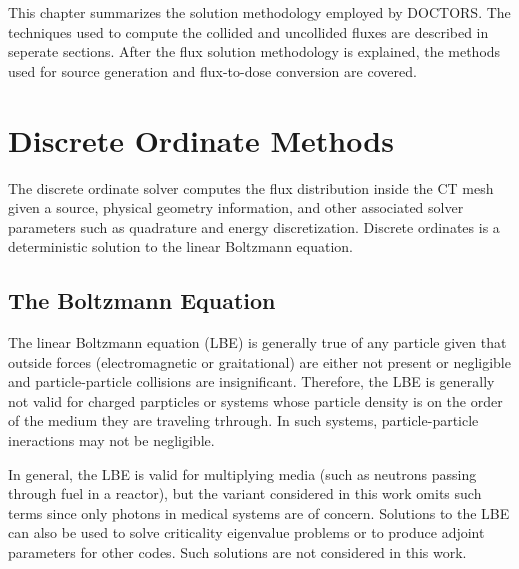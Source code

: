 
This chapter summarizes the solution methodology employed by DOCTORS. The techniques used to compute the collided and uncollided fluxes are described in seperate sections. After the flux solution methodology is explained, the methods used for source generation and flux-to-dose conversion are covered.

\section{Discrete Ordinate Methods}

The discrete ordinate solver computes the flux distribution inside the CT mesh given a source, physical geometry information, and other associated solver parameters such as quadrature and energy discretization. Discrete ordinates is a deterministic solution to the linear Boltzmann equation.

\subsection{The Boltzmann Equation}

The linear Boltzmann equation (LBE) is generally true of any particle given that outside forces (electromagnetic or graitational) are either not present or negligible and particle-particle collisions are insignificant. Therefore, the LBE is generally not valid for charged parpticles or systems whose particle density is on the order of the medium they are traveling trhrough. In such systems, particle-particle ineractions may not be negligible.  

In general, the LBE is valid for multiplying media (such as neutrons passing through fuel in a reactor), but the variant considered in this work omits such terms since only photons in medical systems are of concern. Solutions to the LBE can also be used to solve criticality eigenvalue problems or to produce adjoint parameters for other codes. Such solutions are not considered in this work.

